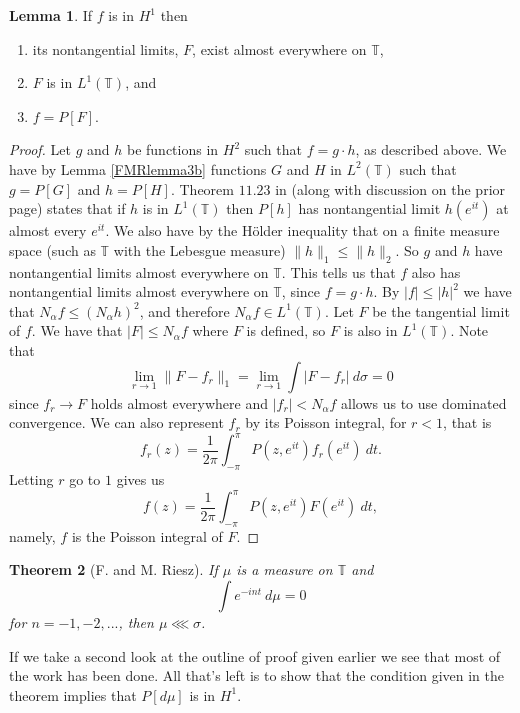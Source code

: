 \documentclass[a4paper,12pt,twoside,BCOR=10mm]{scrbook}
\newtheorem{theorem}{Theorem}[section]
\theoremstyle{definition}
\theoremstyle{definition}
\newtheorem{lemma}[theorem]{Lemma}
\theoremstyle{definition}
\begin{document}
\begin{lemma}
\label{FMRlemma2}
If $f$ is in $H^1$ then
\begin{enumerate}
\item \label{p1}
its nontangential limits, $F$, exist almost everywhere on $\mathbb{T}$,
\item \label{p2}
$F$ is in $L^1(\mathbb{T})$, and
\item \label{p3}
$f = P[F]$.
\end{enumerate}
\end{lemma}
\begin{proof}
Let $g$ and $h$ be functions in $H^2$ such that $f = g \cdot h$, as described above.
We have by Lemma \ref{FMRlemma3b} functions $G$ and $H$ in $L^2(\mathbb{T})$ such that $g = P[G]$ and $h = P[H]$.
Theorem $11.23$ in \citep{rudin2} (along with discussion on the prior page) states that if $h$ is in $L^1(\mathbb{T})$ then $P[h]$ has nontangential limit $h(e^{it})$ at almost every $e^{it}$.
We also have by the Hölder inequality that on a finite measure space (such as $\mathbb{T}$ with the Lebesgue measure) $\|h\|_1 \leq \|h\|_2$.
So $g$ and $h$ have nontangential limits almost everywhere on $\mathbb{T}$.
This tells us that $f$ also has nontangential limits almost everywhere on $\mathbb{T}$, since $f = g \cdot h$.
By $|f| \leq |h|^2$ we have that $N_{\alpha}f \leq (N_{\alpha}h)^2$, and therefore $N_{\alpha}f \in L^1(\mathbb{T})$.
Let $F$ be the tangential limit of $f$.
We have that $|F| \leq N_{\alpha}f$ where $F$ is defined, so $F$ is also in $L^1(\mathbb{T})$.
Note that
\[
	\lim_{r \rightarrow 1} \|F - f_r\|_1 = \lim_{r \rightarrow 1} \int |F - f_r|\ d\sigma = 0
\]
since $f_r \rightarrow F$ holds almost everywhere and $|f_r| < N_{\alpha}f$ allows us to use dominated convergence.
We can also represent $f_r$ by its Poisson integral, for $r < 1$, that is
\[
	f_r(z) = \frac{1}{2\pi} \int_{-\pi}^{\pi} P(z, e^{it})f_r(e^{it})\ dt.
\]
Letting $r$ go to $1$ gives us
\[
	f(z) = \frac{1}{2\pi} \int_{-\pi}^{\pi} P(z, e^{it})F(e^{it})\ dt,
\]
namely, $f$ is the Poisson integral of $F$.
\end{proof}
\begin{theorem}[F. and M. Riesz]
If $\mu$ is a measure on $\mathbb{T}$ and
\[
	\int e^{-int}\ d\mu = 0
\]
for $n = -1, -2, ...$, then $\mu \lll \sigma$.
\end{theorem}
If we take a second look at the outline of proof given earlier we see that most of the work has been done.
All that's left is to show that the condition given in the theorem implies that $P[d\mu]$ is in $H^1$.
\end{document}

